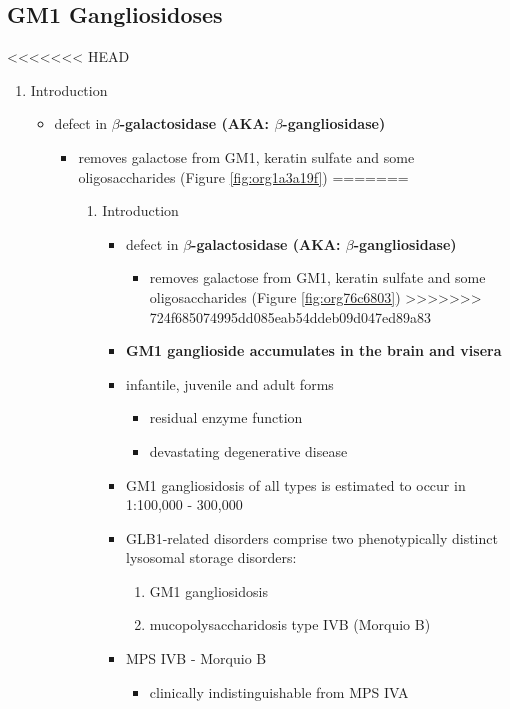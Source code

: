 \documentclass[fontsize=12pt]{scrartcl}
\begin{document}
\begin{enumerate}
\begin{enumerate}
\begin{enumerate}
\begin{enumerate}
\begin{table}[htbp]
\begin{enumerate}
\begin{enumerate}
\begin{table}[htbp]
\subsection{GM1 Gangliosidoses}
<<<<<<< HEAD
\label{sec:org8573424}
\begin{enumerate}
\item Introduction
\label{sec:org0a7e0ad}
\begin{itemize}
\item defect in \textbf{\(\beta\)-galactosidase (AKA: \(\beta\)-gangliosidase)}
\begin{itemize}
\item removes galactose from GM1, keratin sulfate and some oligosaccharides (Figure \ref{fig:org1a3a19f})
=======
\label{sec:orgb6cc92f}
\begin{enumerate}
\item Introduction
\label{sec:orgc189630}
\begin{itemize}
\item defect in \textbf{\(\beta\)-galactosidase (AKA: \(\beta\)-gangliosidase)}
\begin{itemize}
\item removes galactose from GM1, keratin sulfate and some oligosaccharides (Figure \ref{fig:org76c6803})
>>>>>>> 724f685074995dd085eab54ddeb09d047ed89a83
\end{itemize}
\item \textbf{GM1 ganglioside accumulates in the brain and visera}
\item infantile, juvenile and adult forms
\begin{itemize}
\item residual enzyme function
\item devastating degenerative disease
\end{itemize}
\item GM1 gangliosidosis of all types is estimated to occur in 1:100,000 - 300,000
\item GLB1-related disorders comprise two phenotypically distinct lysosomal storage disorders:
\begin{enumerate}
\item GM1 gangliosidosis
\item mucopolysaccharidosis type IVB (Morquio B)
\end{enumerate}
\item MPS IVB - Morquio B
\begin{itemize}
\item clinically indistinguishable from MPS IVA 
\begin{itemize}

\end{itemize}
\end{itemize}
\end{itemize}
\end{enumerate}
\end{itemize}
\end{itemize}
\end{enumerate}
\end{table}
\end{enumerate}
\end{enumerate}
\end{table}
\end{enumerate}
\end{enumerate}
\end{enumerate}
\end{enumerate}
\end{document}
